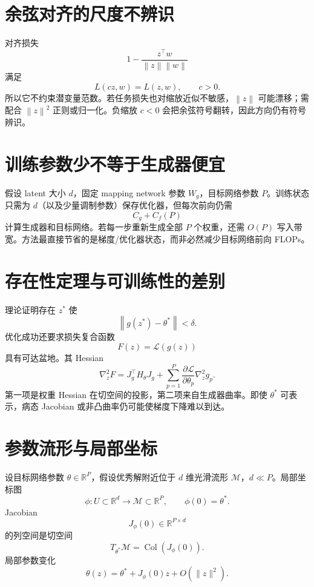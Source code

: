 \documentclass[UTF8,12pt,a4paper,fontset=none]{ctexart}
\numberwithin{equation}{section}
\newcommand{\R}{\mathbb{R}}
\newcommand{\Loss}{\mathcal{L}}
\newcommand{\norm}[1]{\left\lVert #1\right\rVert}
\begin{document}
\section{余弦对齐的尺度不辨识}
对齐损失
\begin{equation}
 1-\frac{z^\top w}{\norm z\norm w}
\end{equation}
满足
\begin{equation}
 L(cz,w)=L(z,w),
 \qquad c>0.
\end{equation}
所以它不约束潜变量范数。若任务损失也对缩放近似不敏感，$\norm z$ 可能漂移；需配合 $\norm z^2$ 正则或归一化。负缩放 $c<0$ 会把余弦符号翻转，因此方向仍有符号辨识。

\section{训练参数少不等于生成器便宜}
假设 latent 大小 $d$，固定 mapping network 参数 $W_g$，目标网络参数 $P$。训练状态只需为 $d$（以及少量调制参数）保存优化器，但每次前向仍需
\begin{equation}
 C_g+ C_f(P)
\end{equation}
计算生成器和目标网络。若每一步重新生成全部 $P$ 个权重，还需 $O(P)$ 写入带宽。方法最直接节省的是梯度/优化器状态，而非必然减少目标网络前向 FLOPs。

\section{存在性定理与可训练性的差别}
理论证明存在 $z^*$ 使
\begin{equation}
 \norm{g(z^*)-\theta^*}<\delta.
\end{equation}
优化成功还要求损失复合函数
\begin{equation}
 F(z)=\Loss(g(z))
\end{equation}
具有可达盆地。其 Hessian
\begin{equation}
 \nabla_z^2F
 =J_g^\top H_\theta J_g
 +\sum_{p=1}^{P}\frac{\partial\Loss}{\partial\theta_p}\nabla_z^2g_p.
\end{equation}
第一项是权重 Hessian 在切空间的投影，第二项来自生成器曲率。即使 $\theta^*$ 可表示，病态 Jacobian 或非凸曲率仍可能使梯度下降难以到达。
\clearpage
\section{参数流形与局部坐标}
设目标网络参数 $\theta\in\R^P$，假设优秀解附近位于 $d$ 维光滑流形 $\mathcal M$，$d\ll P$。局部坐标图
\begin{equation}
 \phi:U\subset\R^d\to\mathcal M\subset\R^P,
 \qquad \phi(0)=\theta^*.
\end{equation}
Jacobian
\begin{equation}
 J_\phi(0)\in\R^{P\times d}
\end{equation}
的列空间是切空间
\begin{equation}
 T_{\theta^*}\mathcal M=
 \operatorname{Col}(J_\phi(0)).
\end{equation}
局部参数变化
\begin{equation}
 \theta(z)=\theta^*+J_\phi(0)z+O(\|z\|^2).
\end{equation}
\end{document}
